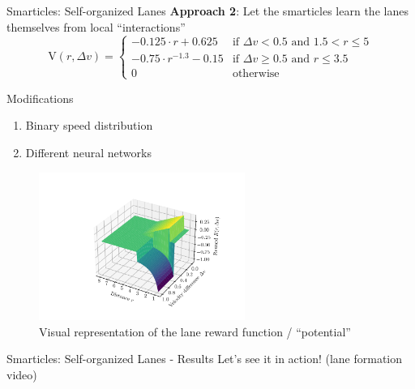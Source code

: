 \documentclass[10pt,xcolor=table, aspectratio=1610]{beamer}
\begin{document}
\begin{frame}{Smarticles: Self-organized Lanes}
  \textbf{Approach 2}: Let the smarticles learn the lanes themselves from local \enquote{interactions}\\
  \begin{equation*}
    \text{V}(r, \Delta v) = \begin{cases}
      -0.125 \cdot r + 0.625 & \text{if } \Delta v < 0.5 \text{ and } 1.5 < r \le 5 \\
      -0.75 \cdot r^{-1.3} - 0.15 & \text{if } \Delta v \ge 0.5 \text{ and } r \le 3.5 \\
      0 & \text{otherwise}
  \end{cases}
  \end{equation*}
  \begin{block}{Modifications}
    \begin{enumerate}
      \item Binary speed distribution
      \item Different neural networks
    \end{enumerate}
  \end{block}
\end{frame}

\begin{frame}
  \begin{figure}
    \includegraphics[width=0.6\textwidth]{../Thesis/img/results/lane_reward_func_3d_cropped.pdf}
    \caption*{\hspace{0.2\textwidth}Visual representation of the lane reward function / \enquote{potential}}
  \end{figure}
\end{frame}

\begin{frame}{Smarticles: Self-organized Lanes - Results}
  Let's see it in action! (lane formation video)
\end{frame}
\end{document}
